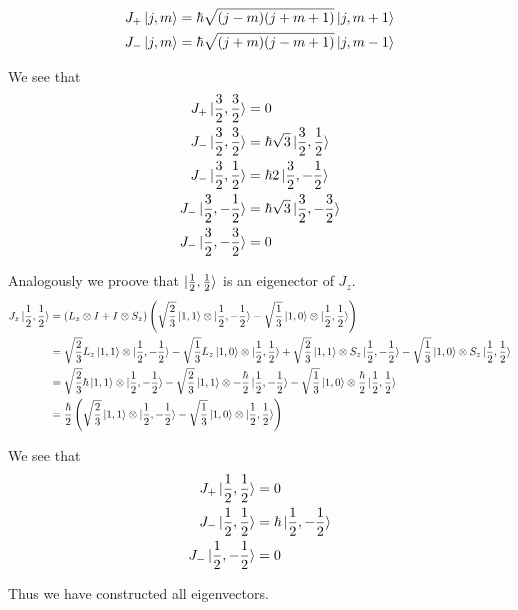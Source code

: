 \documentclass[a4paper,german,12pt,smallheadings]{scrartcl}
\begin{document}
\begin{enumerate}[a)]
    \begin{align*}
      J_+ \ket{j, m} &= \hbar \sqrt{(j-m)(j+m+1)} \ket{j, m+1} \\
      J_- \ket{j, m} &= \hbar \sqrt{(j+m)(j-m+1)} \ket{j, m-1} \\
    \end{align*}

    We see that
    \begin{align*}
      J_+ \ket{\frac{3}{2}, \frac{3}{2}} &= 0 \\
      J_- \ket{\frac{3}{2}, \frac{3}{2}} &= \hbar \sqrt{3} \ket{\frac{3}{2}, \frac{1}{2}} \\
      J_- \ket{\frac{3}{2}, \frac{1}{2}} &= \hbar 2 \ket{\frac{3}{2}, -\frac{1}{2}} \\
      J_- \ket{\frac{3}{2}, -\frac{1}{2}} &= \hbar \sqrt{3} \ket{\frac{3}{2}, -\frac{3}{2}} \\
      J_- \ket{\frac{3}{2}, -\frac{3}{2}} &= 0
    \end{align*}

    Analogously we proove that $\ket{\frac{1}{2}, \frac{1}{2}}$ is an
    eigenector of $J_z$.
    \begin{align*}
      J_z \ket{\frac{1}{2}, \frac{1}{2}} 
      &= (L_z \otimes I + I \otimes S_z) \del{
        \sqrt{\frac{2}{3}}\ket{1,1} \otimes \ket{\frac{1}{2}, -\frac{1}{2}} -
        \sqrt{\frac{1}{3}}\ket{1,0} \otimes \ket{\frac{1}{2}, \frac{1}{2}}
      }\\
      &=
        \sqrt{\frac{2}{3}}L_z\ket{1,1} \otimes \ket{\frac{1}{2}, -\frac{1}{2}} -
        \sqrt{\frac{1}{3}}L_z\ket{1,0} \otimes \ket{\frac{1}{2}, \frac{1}{2}} +
        \sqrt{\frac{2}{3}}\ket{1,1} \otimes S_z\ket{\frac{1}{2}, -\frac{1}{2}} -
        \sqrt{\frac{1}{3}}\ket{1,0} \otimes S_z\ket{\frac{1}{2}, \frac{1}{2}} \\
      &=
        \sqrt{\frac{2}{3}} \hbar \ket{1,1} \otimes \ket{\frac{1}{2}, -\frac{1}{2}} -
        \sqrt{\frac{2}{3}}\ket{1,1} \otimes -\frac{\hbar}{2} \ket{\frac{1}{2}, -\frac{1}{2}} -
        \sqrt{\frac{1}{3}}\ket{1,0} \otimes \frac{\hbar}{2} \ket{\frac{1}{2}, \frac{1}{2}} \\
      &= \frac{\hbar}{2} \del{
        \sqrt{\frac{2}{3}}\ket{1,1} \otimes \ket{\frac{1}{2}, -\frac{1}{2}} -
        \sqrt{\frac{1}{3}}\ket{1,0} \otimes \ket{\frac{1}{2}, \frac{1}{2}}
      }\\
    \end{align*}

    We see that
    \begin{align*}
      J_+ \ket{\frac{1}{2}, \frac{1}{2}} &= 0 \\
      J_- \ket{\frac{1}{2}, \frac{1}{2}} &= \hbar \ket{\frac{1}{2}, -\frac{1}{2}} \\
      J_- \ket{\frac{1}{2}, -\frac{1}{2}} &= 0
    \end{align*}

    Thus we have constructed all eigenvectors.


\end{enumerate}
\end{document}
